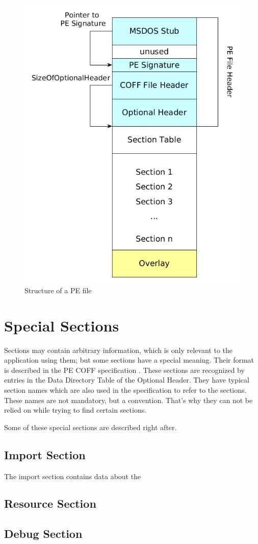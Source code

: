 \begin{figure}
\includegraphics[width=.98\textwidth, height=\textheight,keepaspectratio]{graphics/peformat}
\caption{Structure of a PE file }
\label{fig:peformat} 
\end{figure}

\section{Special Sections}

Sections may contain arbitrary information, which is only relevant to the application using them; but some sections have a special meaning. Their format is described in the PE COFF specification \cite{pespec}. These sections are recognized by entries in the Data Directory Table of the Optional Header. They have typical section names which are also used in the specification to refer to the sections. These names are not mandatory, but a convention. That's why they can not be relied on while trying to find certain sections.

Some of these special sections are described right after.

\subsection*{Import Section}

The import section contains data about the

\subsection*{Resource Section}

\subsection*{Debug Section}
